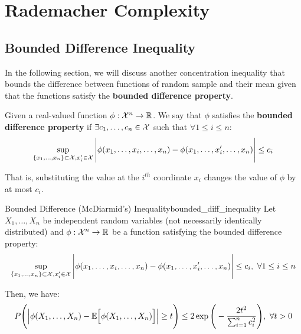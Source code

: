 \newpage\section{Rademacher Complexity}
\subsection{Bounded Difference Inequality}
In the following section, we will discuss another concentration inequality that bounds the difference between functions of random sample and their mean given that the functions satisfy the \textbf{bounded difference property}.

\begin{definition}
    Given a real-valued function $\phi:\mathcal{X}^n\to\mathbb{R}$. We say that $\phi$ satisfies the \textbf{bounded difference property} if $\exists c_1, \dots, c_n\in\mathcal{X}$ such that $\forall 1 \le i \le n$:
    \begin{align*}
        \sup_{\{x_1, \dots, x_n\}\subset\mathcal{X}, x_i' \in \mathcal{X}}
        \Bigg| 
            \phi(x_1, \dots, x_i, \dots, x_n) - \phi(x_1, \dots, x_i', \dots, x_n)
         \Bigg| \le c_i
    \end{align*}

    \noindent That is, substituting the value at the $i^{th}$ coordinate $x_i$ changes the value of $\phi$ by at most $c_i$.
\end{definition}

\begin{theorem}{Bounded Difference (McDiarmid's) Inequality}{bounded_diff_inequality}
    Let $X_1, \dots, X_n$ be independent random variables (not necessarily identically distributed) and $\phi:\mathcal{X}^n \to \mathbb{R}$ be a function satisfying the bounded difference property:
    \begin{align*}
        \sup_{\{x_1, \dots, x_n\}\subset\mathcal{X}, x_i' \in \mathcal{X}}
        \Bigg| 
            \phi(x_1, \dots, x_i, \dots, x_n) - \phi(x_1, \dots, x_i', \dots, x_n)
         \Bigg| \le c_i, \ \forall 1\le i \le n
    \end{align*}

    \noindent Then, we have:
    \begin{align*}
        P\Bigg( 
            \Big| 
                \phi(X_1, \dots, X_n) - \mathbb{E}\Big[  \phi(X_1, \dots, X_n)  \Big]
             \Big| \ge t
         \Bigg) \le 2\exp\Bigg( 
            -\frac{2t^2}{\sum_{i=1}^n c_i^2}
         \Bigg), \ \forall t > 0
    \end{align*}
\end{theorem}

